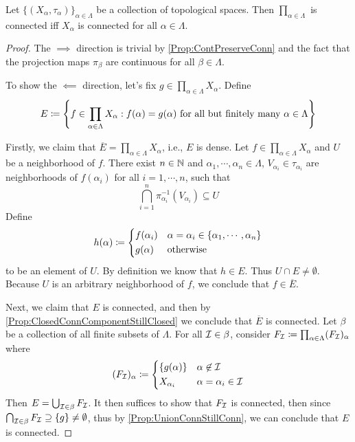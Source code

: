\documentclass[screen]{techreport}
\numberwithin{equation}{section}
\begin{document}
\begin{theorem}\label{The:ProdConnIffEachConn}
	Let $\{(X_\alpha,\tau_\alpha)\}_{\alpha \in \Lambda}$ be a collection of topological spaces.
	Then $\prod_{\alpha \in \Lambda}$ is connected iff $X_\alpha$ is connected for all $\alpha \in \Lambda$.
\end{theorem}
\begin{proof}
	The $\implies$ direction is trivial by \cref{Prop:ContPreserveConn} and the fact that the projection maps $\pi_\beta$ are continuous for all $\beta \in \Lambda$.
	
	To show the $\impliedby$ direction, let's fix $g \in \prod_{\alpha \in \Lambda} X_\alpha$. Define
	\[
	E \coloneqq \left\{ { f \in \prod_{\alpha \in \Lambda} X_\alpha : f(\alpha)=g(\alpha)~\text{for all but finitely many $\alpha \in \Lambda$} } \right\}
	\]
	
	Firstly, we claim that $\overline{E} = \prod_{\alpha \in \Lambda} X_\alpha$, i.e., $E$ is dense.
	Let $f \in \prod_{\alpha \in \Lambda} X_\alpha$ and $U$ be a neighborhood of $f$.
	There exist $n \in \mathbb{N}$ and $\alpha_1,\cdots,\alpha_n \in \Lambda$, $V_{\alpha_i} \in \tau_{\alpha_i}$ are neighborhoods of $f(\alpha_i)$ for all $i=1,\cdots,n$, such that
	\[
	\bigcap_{i=1}^n \pi_{\alpha_i}^{-1}(V_{\alpha_i}) \subseteq U
	\]
	Define
	\[
	h(\alpha) \coloneqq \begin{dcases}
 		f(\alpha_i) & \alpha=\alpha_i  \in \{ \alpha_1,\cdots, \alpha_n \} \\
 		g(\alpha) & \text{otherwise}
 	\end{dcases}
	\]
	to be an element of $U$.
	By definition we know that $h \in E$.
	Thus $U \cap E \neq \emptyset$.
	Because $U$ is an arbitrary neighborhood of $f$, we conclude that $f \in \overline{E}$.
	
	Next, we claim that $E$ is connected, and then by \cref{Prop:ClosedConnComponentStillClosed} we conclude that $\overline{E}$ is connected.
	Let $\beta$ be a collection of all finite subsets of $\Lambda$.
	For all $\mathcal{I} \in \beta$, consider $F_{\mathcal{I}} \coloneqq \prod_{\alpha \in \Lambda} (F_{\mathcal{I}})_\alpha$ where
	\[
	(F_{\mathcal{I}})_\alpha \coloneqq \begin{dcases}
 		\{ g(\alpha)\} & \alpha \not\in \mathcal{I} \\
 		X_{\alpha_i} & \alpha=\alpha_i \in \mathcal{I}
 	\end{dcases}
	\]
	Then $E = \bigcup_{\mathcal{I} \in \beta} F_{\mathcal{I}}$.
	It then suffices to show that $F_{\mathcal{I}}$ is connected, then since $\bigcap_{\mathcal{I} \in \beta} F_{\mathcal{I}} \supseteq \{g\} \neq \emptyset$, thus by \cref{Prop:UnionConnStillConn}, we can conclude that $E$ is connected.
	

\end{proof}
\end{document}
